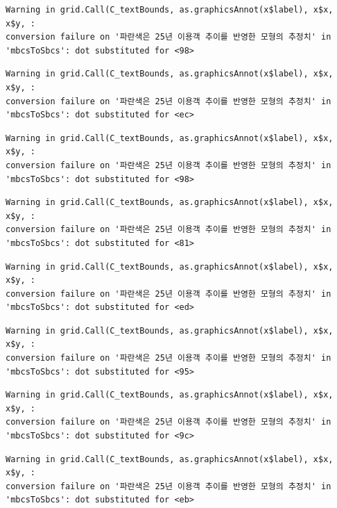 \documentclass[
  letterpaper,
  DIV=11,
  numbers=noendperiod]{scrreprt}
\begin{document}
\begin{verbatim}
Warning in grid.Call(C_textBounds, as.graphicsAnnot(x$label), x$x, x$y, :
conversion failure on '파란색은 25년 이용객 추이를 반영한 모형의 추정치' in
'mbcsToSbcs': dot substituted for <98>
\end{verbatim}

\begin{verbatim}
Warning in grid.Call(C_textBounds, as.graphicsAnnot(x$label), x$x, x$y, :
conversion failure on '파란색은 25년 이용객 추이를 반영한 모형의 추정치' in
'mbcsToSbcs': dot substituted for <ec>
\end{verbatim}

\begin{verbatim}
Warning in grid.Call(C_textBounds, as.graphicsAnnot(x$label), x$x, x$y, :
conversion failure on '파란색은 25년 이용객 추이를 반영한 모형의 추정치' in
'mbcsToSbcs': dot substituted for <98>
\end{verbatim}

\begin{verbatim}
Warning in grid.Call(C_textBounds, as.graphicsAnnot(x$label), x$x, x$y, :
conversion failure on '파란색은 25년 이용객 추이를 반영한 모형의 추정치' in
'mbcsToSbcs': dot substituted for <81>
\end{verbatim}

\begin{verbatim}
Warning in grid.Call(C_textBounds, as.graphicsAnnot(x$label), x$x, x$y, :
conversion failure on '파란색은 25년 이용객 추이를 반영한 모형의 추정치' in
'mbcsToSbcs': dot substituted for <ed>
\end{verbatim}

\begin{verbatim}
Warning in grid.Call(C_textBounds, as.graphicsAnnot(x$label), x$x, x$y, :
conversion failure on '파란색은 25년 이용객 추이를 반영한 모형의 추정치' in
'mbcsToSbcs': dot substituted for <95>
\end{verbatim}

\begin{verbatim}
Warning in grid.Call(C_textBounds, as.graphicsAnnot(x$label), x$x, x$y, :
conversion failure on '파란색은 25년 이용객 추이를 반영한 모형의 추정치' in
'mbcsToSbcs': dot substituted for <9c>
\end{verbatim}

\begin{verbatim}
Warning in grid.Call(C_textBounds, as.graphicsAnnot(x$label), x$x, x$y, :
conversion failure on '파란색은 25년 이용객 추이를 반영한 모형의 추정치' in
'mbcsToSbcs': dot substituted for <eb>
\end{verbatim}
\end{document}
